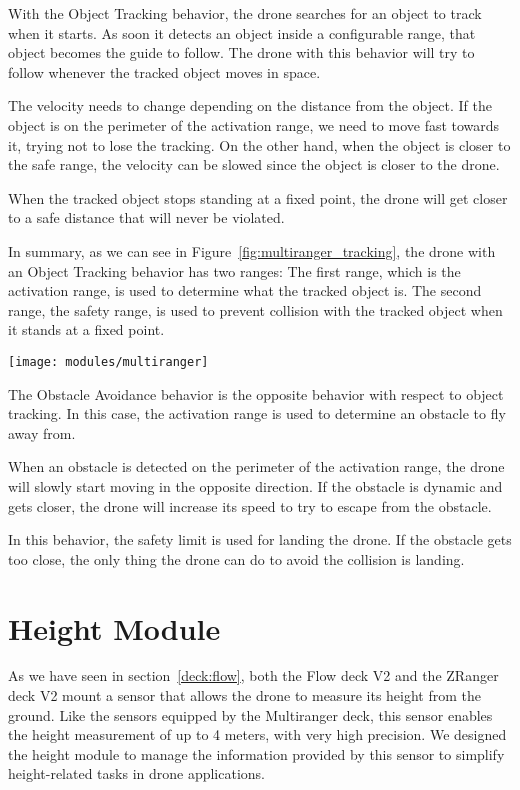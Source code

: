 With the Object Tracking behavior, the drone searches for an object to track when it starts. 
As soon it detects an object inside a configurable range, that object becomes the guide to follow. 
The drone with this behavior will try to follow whenever the tracked object moves in space. 

The velocity needs to change depending on the distance from the object. 
If the object is on the perimeter of the activation range, we need to move fast towards it, trying not to lose the tracking. 
On the other hand, when the object is closer to the safe range, the velocity can be slowed since the object is closer to the drone.

When the tracked object stops standing at a fixed point, the drone will get closer to a safe distance that will never be violated.

In summary, as we can see in Figure~\ref{fig:multiranger_tracking}, the drone with an Object Tracking behavior has two ranges:
The first range, which is the activation range, is used to determine what the tracked object is.
The second range, the safety range, is used to prevent collision with the tracked object when it stands at a fixed point.

\begin{SCfigure}[\sidecaptionrelwidth][tb]
    \texttt{[image: modules/multiranger]}
    \caption{Multiranger Object Tracking behavior.}\label{fig:multiranger_tracking}
\end{SCfigure}

The Obstacle Avoidance behavior is the opposite behavior with respect to object tracking. 
In this case, the activation range is used to determine an obstacle to fly away from.

When an obstacle is detected on the perimeter of the activation range, the drone will slowly start moving in the opposite direction. 
If the obstacle is dynamic and gets closer, the drone will increase its speed to try to escape from the obstacle.

In this behavior, the safety limit is used for landing the drone. 
If the obstacle gets too close, the only thing the drone can do to avoid the collision is landing.

\section{Height Module}\label{sec:module_height}

As we have seen in section~\ref{deck:flow}, both the Flow deck V2 and the ZRanger deck V2 mount a sensor that allows the drone to measure its height from the ground.
Like the sensors equipped by the Multiranger deck, this sensor enables the height measurement of up to 4 meters, with very high precision.
We designed the height module to manage the information provided by this sensor to simplify height-related tasks in drone applications.

